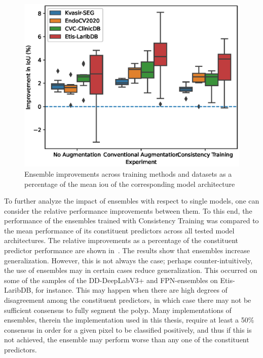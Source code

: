 \begin{figure}
    \centering
    \includegraphics[width=\linewidth]{illustrations/ensemble_improvements.eps}
    \caption[Ensemble improvements across training methods]{Ensemble improvements across training methods and datasets as a percentage of the mean \gls{iou} of the corresponding model architecture}
    \label{fig:ensemble_improvements_across_training_methods}
\end{figure}



To further analyze the impact of ensembles with respect to single models, one can consider the relative performance improvements between them. To this end, the performance of the ensembles trained with Consistency Training was compared to the mean performance of its constituent predictors across all tested model architectures. The relative improvements as a percentage of the constituent predictor performance are shown in~. The results show that ensembles increase generalization. However, this is not always the case; perhaps counter-intuitively, the use of ensembles may in certain cases reduce generalization. This occurred on some of the samples of the DD-DeepLabV3+ and FPN-ensembles on Etis-LaribDB, for instance. This may happen when there are high degrees of disagreement among the constituent predictors, in which case there may not be sufficient consensus to fully segment the polyp. Many implementations of ensembles, therein the implementation used in this thesis, require at least a 50\% consensus in order for a given pixel to be classified positively, and thus if this is not achieved, the ensemble may perform worse than any one of the constituent predictors. 

